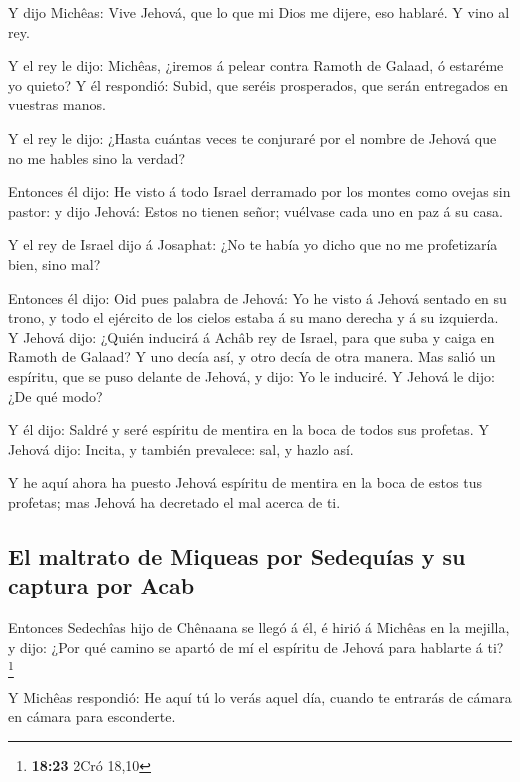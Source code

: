  Y dijo Michêas: Vive Jehová, que lo que mi Dios me dijere,
eso hablaré. Y vino al rey.

 Y el rey le dijo: Michêas, ¿iremos á pelear contra Ramoth
de Galaad, ó estaréme yo quieto? Y él respondió: Subid, que seréis
prosperados, que serán entregados en vuestras manos.

 Y el rey le dijo: ¿Hasta cuántas veces te conjuraré por el
nombre de Jehová que no me hables sino la verdad?

 Entonces él dijo: He visto á todo Israel derramado por los
montes como ovejas sin pastor: y dijo Jehová: Estos no tienen señor;
vuélvase cada uno en paz á su casa.

 Y el rey de Israel dijo á Josaphat: ¿No te había yo dicho
que no me profetizaría bien, sino mal?

 Entonces él dijo: Oid pues palabra de Jehová: Yo he visto
á Jehová sentado en su trono, y todo el ejército de los cielos estaba á
su mano derecha y á su izquierda.  Y Jehová dijo: ¿Quién
inducirá á Achâb rey de Israel, para que suba y caiga en Ramoth de
Galaad? Y uno decía así, y otro decía de otra manera.  Mas
salió un espíritu, que se puso delante de Jehová, y dijo: Yo le
induciré. Y Jehová le dijo: ¿De qué modo?

 Y él dijo: Saldré y seré espíritu de mentira en la boca de
todos sus profetas. Y Jehová dijo: Incita, y también prevalece: sal, y
hazlo así.

 Y he aquí ahora ha puesto Jehová espíritu de mentira en la
boca de estos tus profetas; mas Jehová ha decretado el mal acerca de ti.

\hypertarget{el-maltrato-de-miqueas-por-sedequuxedas-y-su-captura-por-acab}{%
\subsection{El maltrato de Miqueas por Sedequías y su captura por
Acab}\label{el-maltrato-de-miqueas-por-sedequuxedas-y-su-captura-por-acab}}

 Entonces Sedechîas hijo de Chênaana se llegó á él, é hirió
á Michêas en la mejilla, y dijo: ¿Por qué camino se apartó de mí el
espíritu de Jehová para hablarte á ti? \footnote{\textbf{18:23} 2Cró
  18,10}

 Y Michêas respondió: He aquí tú lo verás aquel día, cuando
te entrarás de cámara en cámara para esconderte.

